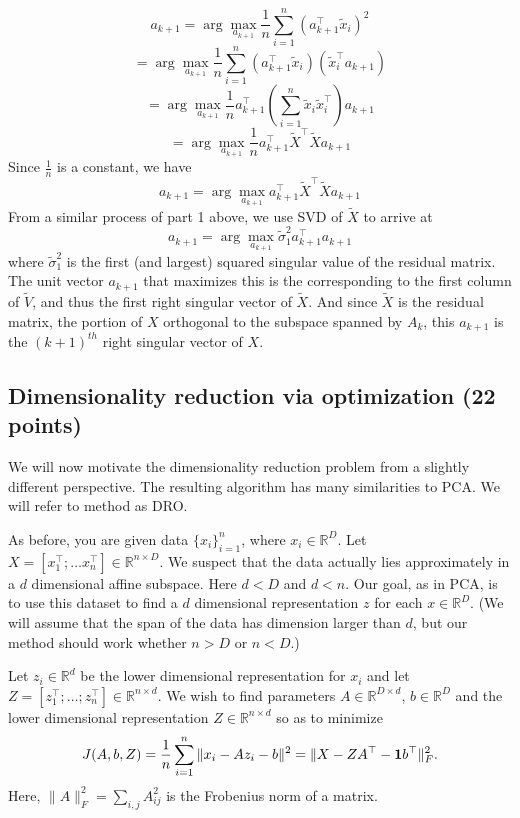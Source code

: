\documentclass[a4paper]{article}
\newcounter{thm}
\newcommand*{\one}{{\bf 1}}
\theoremstyle{definition}
\newcommand{\RR}{\mathbb{R}}
\newenvironment{soln}{
	\leavevmode\color{blue}\ignorespaces
}{}
\begin{document}
\begin{enumerate}
\begin{soln}
	$$a_{k+1} = \arg \max_{a_{k+1}} \frac{1}{n} \sum_{i=1}^{n} (a_{k+1}^\top \tilde{x}_i)^2$$
	$$ = \arg \max_{a_{k+1}} \frac{1}{n} \sum_{i=1}^{n} (a_{k+1}^\top \tilde{x}_i)(\tilde{x}_i^\top a_{k+1})$$
	$$ = \arg \max_{a_{k+1}} \frac{1}{n} a_{k+1}^\top \left( \sum_{i=1}^{n} \tilde{x}_i \tilde{x}_i^\top\right) a_{k+1}$$
	$$ = \arg \max_{a_{k+1}} \frac{1}{n} a_{k+1}^\top \tilde{X}^\top \tilde{X} a_{k+1}$$
	Since $\frac{1}{n}$ is a constant, we have
	$$a_{k+1} = \arg \max_{a_{k+1}} a_{k+1}^\top \tilde{X}^\top \tilde{X} a_{k+1}$$
	From a similar process of part 1 above, we use SVD of $\tilde{X}$ to arrive at
	$$a_{k+1} = \arg \max_{a_{k+1}} \tilde{\sigma}_1^2 a_{k+1}^\top a_{k+1}$$
	where $\tilde{\sigma}_1^2$ is the first (and largest) squared singular value of the residual matrix. The unit vector $a_{k+1}$ that maximizes this is the corresponding to the first column of $\tilde{V}$, and thus the first right singular vector of $\tilde{X}$. And since $\tilde{X}$ is the residual matrix, the portion of $X$ orthogonal to the subspace spanned by $A_k$, this $a_{k+1}$ is the $(k+1)^{th}$ right singular vector of $X$.
\end{soln}

\end{enumerate}


\subsection{Dimensionality reduction via optimization (22 points)}

We will now motivate the dimensionality reduction problem from a slightly different
perspective. The resulting algorithm has many similarities to PCA.
We will refer to method as DRO.

As before, you are given data $\{x_i\}_{i=1}^n$, where $x_i \in \RR^D$. Let $X=[x_1^\top; \dots
x_n^\top] \in \RR^{n\times D}$. We suspect that the data
actually lies approximately in  a $d$ dimensional affine subspace.
Here $d<D$ and $d<n$.
Our goal, as in PCA, is to use this dataset to find a $d$ dimensional representation $z$ for each $x\in\RR^D$.
(We will assume that the span of the data has dimension larger than
$d$, but our method should work whether $n>D$ or $n<D$.)


Let $z_i\in \RR^d$ be the lower dimensional representation for $x_i$ and
let $Z = [z_1^\top; \dots; z_n^\top] \in \RR^{n\times d}$.
We wish to find parameters $A \in \RR^{D\times d}$, $b\in\RR^D$ and the lower
dimensional representation $Z\in \RR^{n\times d}$ so as to minimize 
\begin{equation}
J(A,b,Z) = \frac{1}{n} \sum_{i=1}^n \|x_i - Az_i - b\|^2 = \| X - ZA^\top - \one b^\top\|_F^2.
\label{eqn:dimobj}
\end{equation}
Here, $\|A\|^2_F = \sum_{i,j} A_{ij}^2$ is the Frobenius norm of a matrix.
\end{document}
